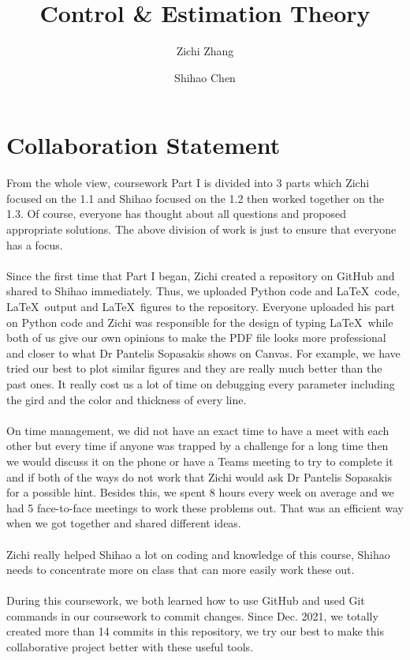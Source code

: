 \documentclass[a4paper,11pt,reqno]{amsart}
\title[ELE8088 Coursework]{Control \& Estimation Theory}
\author[Z. Zhang]{Zichi Zhang}
\author[S. Chen]{Shihao Chen}
\begin{document}
\maketitle

\vspace*{\fill}
\section*{\textbf{Collaboration Statement}}
    \noindent From the whole view, coursework Part I is divided into 3 parts which Zichi focused on the 1.1 and Shihao focused on the 1.2 then worked together on the 1.3.
    Of course, everyone has thought about all questions and proposed appropriate solutions. The above division of work is just to ensure that everyone has a focus.
    \\ \ \\
    Since the first time that Part I began, Zichi created a repository on GitHub and shared to Shihao immediately. Thus, we uploaded Python code and \LaTeX\ code, \LaTeX\ output and \LaTeX\ figures to the repository. Everyone uploaded his part on Python code and Zichi was responsible for the design of typing \LaTeX\ while both of us give our own opinions to make the PDF file looks more professional and closer to what Dr Pantelis Sopasakis shows on Canvas. For example, we have tried our best to plot similar figures and they are really much better than the past ones. It really cost us a lot of time on debugging every parameter including the gird and the color and thickness of every line.
    \\ \ \\
    On time management, we did not have an exact time to have a meet with each other but every time if anyone was trapped by a challenge for a long time then we would discuss it on the phone or have a Teams meeting to try to complete it and if both of the ways do not work that Zichi would ask Dr Pantelis Sopasakis for a possible hint. Besides this, we spent 8 hours every week on average and we had 5 face-to-face meetings to work these problems out. That was an efficient way when we got together and shared different ideas.
    \\ \ \\
    Zichi really helped Shihao a lot on coding and knowledge of this course, Shihao needs to concentrate more on class that can more easily work these out.
    \\ \ \\
    During this coursework, we both learned how to use GitHub and used Git commands in our coursework to commit changes. Since Dec. 2021, we totally created more than 14 commits in this repository, we try our best to make this collaborative project better with these useful tools.
\vspace*{\fill}
\newpage
\end{document}
